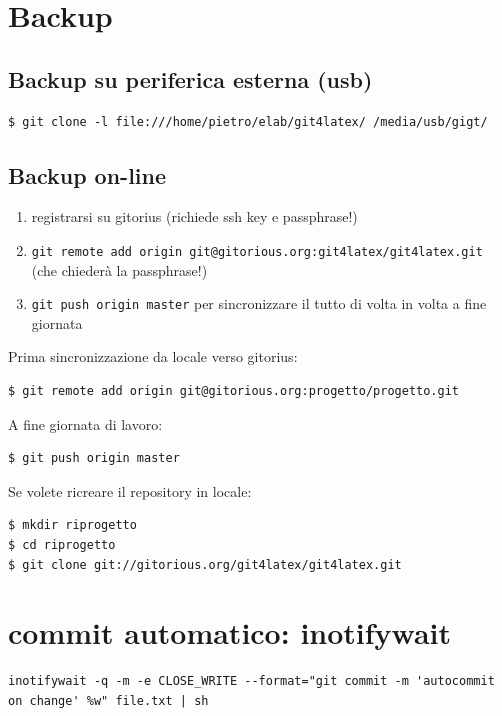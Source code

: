 \documentclass[a4paper,12pt,oneside]{article}
\begin{document}
\section{Backup}
\subsection{Backup su periferica esterna (usb)}
\begin{lstlisting}
$ git clone -l file:///home/pietro/elab/git4latex/ /media/usb/gigt/
\end{lstlisting}

\subsection{Backup on-line}
\label{sec:backup-on-line}

\begin{enumerate}
\item registrarsi su gitorius (richiede ssh key e passphrase!)
\item \lstinline|git remote add origin git@gitorious.org:git4latex/git4latex.git|
  (che chiederà la passphrase!)
\item \lstinline|git push origin master|
  per sincronizzare il tutto di volta in volta a fine giornata
\end{enumerate}

Prima sincronizzazione da locale verso gitorius:
\begin{lstlisting}
$ git remote add origin git@gitorious.org:progetto/progetto.git
\end{lstlisting}

A fine giornata di lavoro:
\begin{lstlisting}
$ git push origin master
\end{lstlisting}

Se volete ricreare il repository in locale:
\begin{lstlisting}
$ mkdir riprogetto
$ cd riprogetto
$ git clone git://gitorious.org/git4latex/git4latex.git
\end{lstlisting}

\section{commit automatico: inotifywait}

\begin{lstlisting}
inotifywait -q -m -e CLOSE_WRITE --format="git commit -m 'autocommit on change' %w" file.txt | sh
\end{lstlisting}
\end{document}
